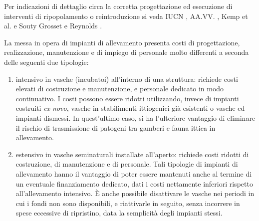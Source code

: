 \documentclass[11pt,a4paper,italian,twoside,openany]{memoir}
\newcommand{\etal}{et al. }
\begin{document}
Per indicazioni di dettaglio circa la corretta progettazione ed esecuzione di interventi di ripopolamento o reintroduzione si veda IUCN \cite{IUCN 2013b}, AA.VV. \cite{AA.VV. 2007}, Kemp \etal \cite{Kemp 2003} e Souty Grosset e Reynolds \cite{Souty-Grosset 2009}.

La messa in opera di impianti di allevamento presenta costi di progettazione, realizzazione, manutenzione e di impiego di personale molto differenti a seconda delle seguenti due tipologie: 
\begin{enumerate}[label={\arabic*)}]
  \item intensivo in vasche (incubatoi) all'interno di una struttura: richiede costi elevati di costruzione e manutenzione, e personale dedicato in modo continuativo. I costi possono essere ridotti utilizzando, invece di impianti costruiti \emph{ex-novo}, vasche in stabilimenti ittiogenici già esistenti o vasche ed impianti dismessi. In quest'ultimo caso, si ha l'ulteriore vantaggio di eliminare il rischio di trasmissione di patogeni tra gamberi e fauna ittica in allevamento.
  \item estensivo in vasche seminaturali installate all'aperto: richiede costi ridotti di costruzione, di manutenzione e di personale. Tali tipologie di impianti di allevamento hanno il vantaggio di poter essere mantenuti anche al termine di un eventuale finanziamento dedicato, dati i costi nettamente inferiori rispetto all'allevamento intensivo. È anche possibile disattivare le vasche nei periodi in cui i fondi non sono disponibili, e riattivarle in seguito, senza incorrere in spese eccessive di ripristino, data la semplicità degli impianti stessi.  
\end{enumerate}
\end{document}
